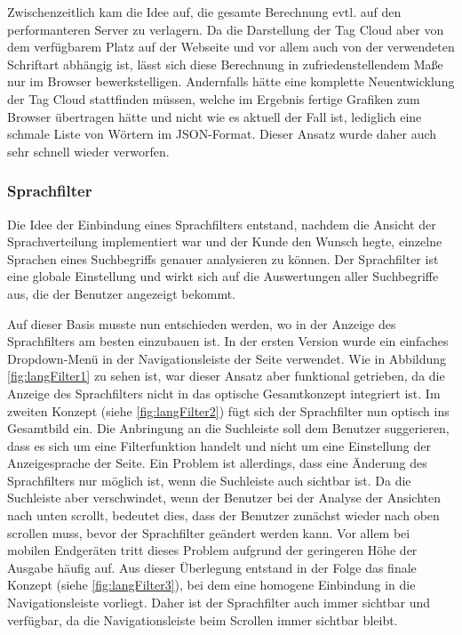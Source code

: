 Zwischenzeitlich kam die Idee auf, die gesamte Berechnung evtl. auf den performanteren Server zu verlagern. Da die Darstellung der Tag Cloud aber von dem verfügbarem Platz auf der Webseite und vor allem auch von der verwendeten Schriftart abhängig ist, lässt sich diese Berechnung in zufriedenstellendem Maße nur im Browser bewerkstelligen.
Andernfalls hätte eine komplette Neuentwicklung der Tag Cloud stattfinden müssen, welche im Ergebnis fertige Grafiken zum Browser übertragen hätte und nicht wie es aktuell der Fall ist, lediglich eine schmale Liste von Wörtern im JSON-Format. Dieser Ansatz wurde daher auch sehr schnell wieder verworfen.

\subsubsection{Sprachfilter}
Die Idee der Einbindung eines Sprachfilters entstand, nachdem die Ansicht der Sprachverteilung implementiert war und der Kunde den Wunsch hegte, einzelne Sprachen eines Suchbegriffs genauer analysieren zu können. Der Sprachfilter ist eine globale Einstellung und wirkt sich auf die Auswertungen aller Suchbegriffe aus, die der Benutzer angezeigt bekommt.

Auf dieser Basis musste nun entschieden werden, wo in der Anzeige des Sprachfilters am besten einzubauen ist. In der ersten Version wurde ein einfaches Dropdown-Menü in der Navigationsleiste der Seite verwendet. Wie in Abbildung \ref{fig:langFilter1} zu sehen ist, war dieser Ansatz aber funktional getrieben, da die Anzeige des Sprachfilters nicht in das optische Gesamtkonzept integriert ist. Im zweiten Konzept (siehe \ref{fig:langFilter2}) fügt sich der Sprachfilter nun optisch ins Gesamtbild ein. Die Anbringung an die Suchleiste soll dem Benutzer suggerieren, dass es sich um eine Filterfunktion handelt und nicht um eine Einstellung der Anzeigesprache der Seite. Ein Problem ist allerdings, dass eine Änderung des Sprachfilters nur möglich ist, wenn die Suchleiste auch sichtbar ist. Da die Suchleiste aber verschwindet, wenn der Benutzer bei der Analyse der Ansichten nach unten scrollt, bedeutet dies, dass der Benutzer zunächst wieder nach oben scrollen muss, bevor der Sprachfilter geändert werden kann. Vor allem bei mobilen Endgeräten tritt dieses Problem aufgrund der geringeren Höhe der Ausgabe häufig auf. Aus dieser Überlegung entstand in der Folge das finale Konzept (siehe \ref{fig:langFilter3}), bei dem eine homogene Einbindung in die Navigationsleiste vorliegt. Daher ist der Sprachfilter auch immer sichtbar und verfügbar, da die Navigationsleiste beim Scrollen immer sichtbar bleibt.

